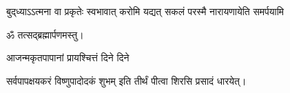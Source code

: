 {बुद्‌ध्याऽऽत्मना वा प्रकृतेः स्वभावात्}
{करोमि यद्यत् सकलं परस्मै}
{नारायणायेति समर्पयामि}


ॐ तत्सद्ब्रह्मार्पणमस्तु।\medskip

{आजन्मकृतपापानां प्रायश्चित्तं दिने दिने}

{सर्वपापक्षयकरं विष्णुपादोदकं शुभम्}
 इति तीर्थं पीत्वा शिरसि प्रसादं धारयेत्।

\closesection